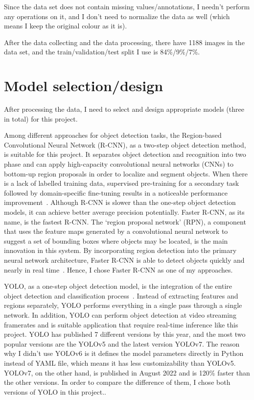 \documentclass[runningheads]{llncs}
\begin{document}
Since the data set does not contain missing values/annotations, I needn't perform any operations on it, and I don't need to normalize the data as well (which means I keep the original colour as it is). 

After the data collecting and the data processing, there have 1188 images in the data set, and the train/validation/test split I use is 84\%/9\%/7\%.


\section{Model selection/design}
After processing the data, I need to select and design appropriate models (three in total) for this project. 

Among different approaches for object detection tasks, the Region-based Convolutional Neural Network (R-CNN), as a two-step object detection method, is suitable for this project. It separates object detection and recognition into two phase and can apply high-capacity convolutional neural networks (CNNs) to bottom-up region proposals in order to localize and segment objects. When there is a lack of labelled training data, supervised pre-training for a secondary task followed by domain-specific fine-tuning results in a noticeable performance improvement~\cite{R-CNN}. Although R-CNN is slower than the one-step object detection models, it can achieve better average precision potentially. Faster R-CNN, as its name, is the fastest R-CNN. The `region proposal network' (RPN), a component that uses the feature maps generated by a convolutional neural network to suggest a set of bounding boxes where objects may be located, is the main innovation in this system. By incorporating region detection into the primary neural network architecture, Faster R-CNN is able to detect objects quickly and nearly in real time~\cite{Faster R-CNN}. Hence, I chose Faster R-CNN as one of my approaches.

YOLO, as a one-step object detection model, is the integration of the entire object detection and classification process~\cite{YOLO}. Instead of extracting features and regions separately, YOLO performs everything in a single pass through a single network. In addition, YOLO can perform object detection at video streaming framerates and is suitable application that require real-time inference like this project. YOLO has published 7 different versions by this year, and the most two popular versions are the YOLOv5 and the latest version YOLOv7. The reason why I didn't use YOLOv6 is it defines the model parameters directly in Python instead of YAML file, which means it has less customizability than YOLOv5. YOLOv7, on the other hand, is published in August 2022 and is 120\% faster than the other versions. In order to compare the difference of them, I chose both versions of YOLO in this project.. 
\end{document}
